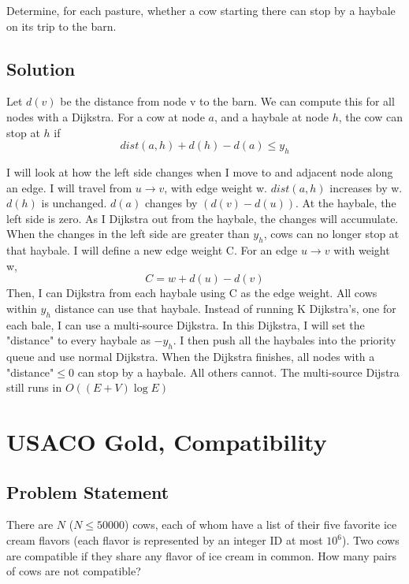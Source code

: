 \documentclass{article}
\begin{document}
    Determine, for each pasture, whether a cow starting there can stop by a haybale on its trip to the barn.
\subsection{Solution}
    Let $d(v)$ be the distance from node v to the barn.  We can compute this for all nodes with a Dijkstra.  For a cow at node $a$, and a haybale at node $h$, the cow can stop at $h$ if
    \[ dist(a,h) + d(h) - d(a) \leq y_h \]
    
    I will look at how the left side changes when I move to and adjacent node along an edge. I will travel from $u\rightarrow v$, with edge weight w. $dist(a,h)$ increases by w. $d(h)$ is unchanged. $d(a)$ changes by $(d(v)-d(u))$.  At the haybale, the left side is zero. As I Dijkstra out from the haybale, the changes will accumulate.  When the changes in the left side are greater than $y_h$, cows can no longer stop at that haybale. I will define a new edge weight C.  For an edge $u\rightarrow v$ with weight w,
    \[ C = w + d(u)-d(v) \]
    Then, I can Dijkstra from each haybale using C as the edge weight. All cows within $y_h$ distance can use that haybale. Instead of running K Dijkstra's, one for each bale, I can use a multi-source Dijkstra. In this Dijkstra, I will set the "distance" to every haybale as $-y_h$. I then push all the haybales into the priority queue and use normal Dijkstra. When the Dijkstra finishes, all nodes with a "distance"$\leq 0$ can stop by a haybale. All others cannot. The multi-source Dijstra still runs in $O((E+V)\log E)$    

\section{USACO Gold, Compatibility}

\subsection{Problem Statement}
    There are $N$ ($N \leq 50000$) cows, each of whom have a list of their five favorite ice cream flavors (each flavor is represented by an integer ID at most $10^6$). Two cows are compatible if they share any flavor of ice cream in common. How many pairs of cows are not compatible?
\end{document}
